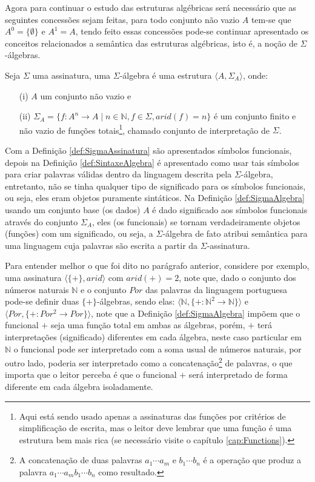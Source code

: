 Agora para continuar o estudo das estruturas algébricas será necessário que as seguintes concessões sejam feitas, para todo conjunto não vazio $A$ tem-se que $A^0 = \{\emptyset\}$ e $A^1 = A$, tendo feito essas concessões pode-se continuar apresentado os conceitos relacionados a semântica das estruturas algébricas, isto é, a noção de $\Sigma$-álgebras.

\begin{definicao}\label{def:SigmaAlgebra}
  Seja $\Sigma$ uma assinatura, uma $\Sigma$-álgebra é uma estrutura $\langle A, \Sigma_A \rangle$, onde:
  \begin{itemize}
    \item[(i)] $A$ um conjunto não vazio e 
    \item[(ii)] $\Sigma_A = \{f: A^n \rightarrow A  \mid n \in \mathbb{N}, f \in \Sigma, arid(f) = n\}$ é um conjunto finito e não vazio de funções totais\footnote{Aqui está sendo usado apenas a assinaturas das funções por critérios de simplificação de escrita, mas o leitor deve lembrar que uma função é uma estrutura bem mais rica (se necessário visite o capítulo \ref{cap:Functions}).}, chamado conjunto de interpretação de $\Sigma$.
  \end{itemize}
\end{definicao}

Com a Definição \ref{def:SigmaAssinatura} são apresentados símbolos funcionais, depois na Definição \ref{def:SintaxeAlgebra} é apresentado como usar tais símbolos para criar palavras válidas dentro da linguagem descrita pela $\Sigma$-álgebra, entretanto, não se tinha qualquer tipo de significado para os símbolos funcionais, ou seja, eles eram objetos puramente sintáticos. Na Definição \ref{def:SigmaAlgebra} usando um conjunto base (os dados) $A$ é dado significado aos símbolos funcionais através do conjunto $\Sigma_A$, eles (os funcionais) se tornam verdadeiramente objetos (funções) com um significado, ou seja, a $\Sigma$-álgebra de fato atribui semântica para uma linguagem cuja palavras são escrita a partir da $\Sigma$-assinatura. 

Para entender melhor o que foi dito no parágrafo anterior, considere por exemplo, uma assinatura $\langle \{+\}, arid \rangle$ com $arid(+)  = 2$, note que, dado o conjunto dos números naturais $\mathbb{N}$ e o conjunto $Por$ das palavras da linguagem portuguesa pode-se definir duas $\{+\}$-álgebras, sendo elas: $\langle \mathbb{N}, \{+ :\mathbb{N}^2 \rightarrow \mathbb{N}\} \rangle$ e $\langle Por, \{+ :Por^2 \rightarrow Por\} \rangle$, note que a Definição \ref{def:SigmaAlgebra} impõem que o funcional $+$ seja uma função total em ambas as álgebras, porém, $+$ terá interpretações (significado) diferentes em cada álgebra, neste caso particular em $\mathbb{N}$ o funcional pode ser interpretado com a soma usual de números naturais, por outro lado, poderia ser interpretado como a concatenação\footnote{A concatenação de duas palavras $a_1\cdots a_m$ e $b_1\cdots b_n$ é a operação que produz a palavra $a_1\cdots a_mb_1\cdots b_n$ como resultado.} de palavras, o que importa que o leitor perceba é que o funcional $+$ será interpretado de forma diferente em cada álgebra isoladamente.

